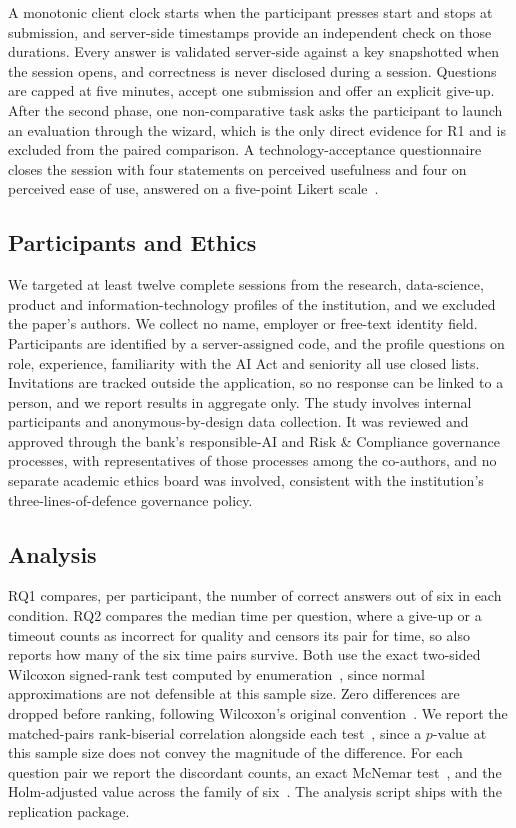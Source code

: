 \documentclass[10pt,conference,a4paper]{IEEEtran}
\begin{document}
A monotonic client clock starts when the participant presses start and stops at submission, and server-side timestamps provide an independent check on those durations.
Every answer is validated server-side against a key snapshotted when the session opens, and correctness is never disclosed during a session.
Questions are capped at five minutes, accept one submission and offer an explicit give-up.
After the second phase, one non-comparative task asks the participant to launch an evaluation through the wizard, which is the only direct evidence for R1 and is excluded from the paired comparison.
A technology-acceptance questionnaire closes the session with four statements on perceived usefulness and four on perceived ease of use, answered on a five-point Likert scale~\cite{davis1989tam}.

\subsection{Participants and Ethics}
We targeted at least twelve complete sessions from the research, data-science, product and information-technology profiles of the institution, and we excluded the paper's authors.
We collect no name, employer or free-text identity field.
Participants are identified by a server-assigned code, and the profile questions on role, experience, familiarity with the AI Act and seniority all use closed lists.
Invitations are tracked outside the application, so no response can be linked to a person, and we report results in aggregate only.
The study involves internal participants and anonymous-by-design data collection.
It was reviewed and approved through the bank's responsible-AI and Risk \& Compliance governance processes, with representatives of those processes among the co-authors, and no separate academic ethics board was involved, consistent with the institution's three-lines-of-defence governance policy.

\subsection{Analysis}
RQ1 compares, per participant, the number of correct answers out of six in each condition.
RQ2 compares the median time per question, where a give-up or a timeout counts as incorrect for quality and censors its pair for time, so  also reports how many of the six time pairs survive.
Both use the exact two-sided Wilcoxon signed-rank test computed by enumeration~\cite{wilcoxon1945}, since normal approximations are not defensible at this sample size.
Zero differences are dropped before ranking, following Wilcoxon's original convention~\cite{wilcoxon1945}.
We report the matched-pairs rank-biserial correlation alongside each test~\cite{kerby2014}, since a $p$-value at this sample size does not convey the magnitude of the difference.
For each question pair we report the discordant counts, an exact McNemar test~\cite{mcnemar1947}, and the Holm-adjusted value across the family of six~\cite{holm1979}.
The analysis script ships with the replication package.
\end{document}
